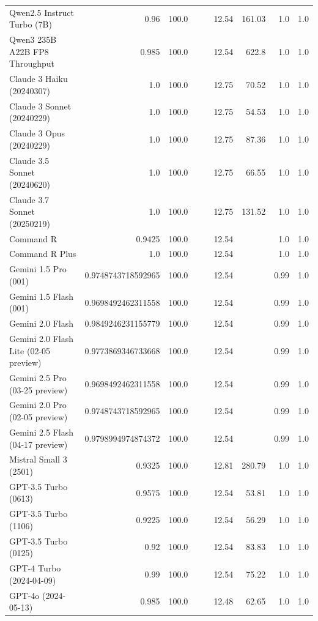 \begin{table}[htp]
{\begin{tabular}{lrrrrrrrr}
Qwen2.5 Instruct Turbo (7B) & 0.96 & 100.0 &  &  & 12.54 & 161.03 & 1.0 & 1.0 \\
Qwen3 235B A22B FP8 Throughput & 0.985 & 100.0 &  &  & 12.54 & 622.8 & 1.0 & 1.0 \\
Claude 3 Haiku (20240307) & 1.0 & 100.0 &  &  & 12.75 & 70.52 & 1.0 & 1.0 \\
Claude 3 Sonnet (20240229) & 1.0 & 100.0 &  &  & 12.75 & 54.53 & 1.0 & 1.0 \\
Claude 3 Opus (20240229) & 1.0 & 100.0 &  &  & 12.75 & 87.36 & 1.0 & 1.0 \\
Claude 3.5 Sonnet (20240620) & 1.0 & 100.0 &  &  & 12.75 & 66.55 & 1.0 & 1.0 \\
Claude 3.7 Sonnet (20250219) & 1.0 & 100.0 &  &  & 12.75 & 131.52 & 1.0 & 1.0 \\
Command R & 0.9425 & 100.0 &  &  & 12.54 &  & 1.0 & 1.0 \\
Command R Plus & 1.0 & 100.0 &  &  & 12.54 &  & 1.0 & 1.0 \\
Gemini 1.5 Pro (001) & 0.9748743718592965 & 100.0 &  &  & 12.54 &  & 0.99 & 1.0 \\
Gemini 1.5 Flash (001) & 0.9698492462311558 & 100.0 &  &  & 12.54 &  & 0.99 & 1.0 \\
Gemini 2.0 Flash & 0.9849246231155779 & 100.0 &  &  & 12.54 &  & 0.99 & 1.0 \\
Gemini 2.0 Flash Lite (02-05 preview) & 0.9773869346733668 & 100.0 &  &  & 12.54 &  & 0.99 & 1.0 \\
Gemini 2.5 Pro (03-25 preview) & 0.9698492462311558 & 100.0 &  &  & 12.54 &  & 0.99 & 1.0 \\
Gemini 2.0 Pro (02-05 preview) & 0.9748743718592965 & 100.0 &  &  & 12.54 &  & 0.99 & 1.0 \\
Gemini 2.5 Flash (04-17 preview) & 0.9798994974874372 & 100.0 &  &  & 12.54 &  & 0.99 & 1.0 \\
Mistral Small 3 (2501) & 0.9325 & 100.0 &  &  & 12.81 & 280.79 & 1.0 & 1.0 \\
GPT-3.5 Turbo (0613) & 0.9575 & 100.0 &  &  & 12.54 & 53.81 & 1.0 & 1.0 \\
GPT-3.5 Turbo (1106) & 0.9225 & 100.0 &  &  & 12.54 & 56.29 & 1.0 & 1.0 \\
GPT-3.5 Turbo (0125) & 0.92 & 100.0 &  &  & 12.54 & 83.83 & 1.0 & 1.0 \\
GPT-4 Turbo (2024-04-09) & 0.99 & 100.0 &  &  & 12.54 & 75.22 & 1.0 & 1.0 \\
GPT-4o (2024-05-13) & 0.985 & 100.0 &  &  & 12.48 & 62.65 & 1.0 & 1.0 \\

\end{tabular}}
\end{table}
